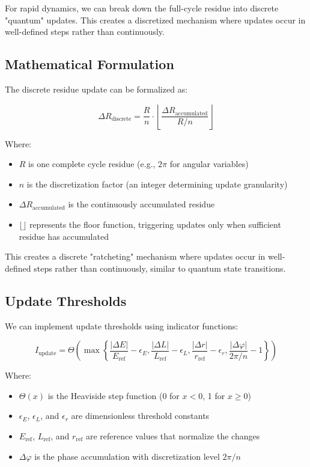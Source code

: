 \documentclass{article}
\begin{document}
For rapid dynamics, we can break down the full-cycle residue into discrete "quantum" updates. This creates a discretized mechanism where updates occur in well-defined steps rather than continuously.

\subsection{Mathematical Formulation}

The discrete residue update can be formalized as:

\begin{equation}
\Delta R_{\text{discrete}} = \frac{R}{n} \cdot \left\lfloor \frac{\Delta R_{\text{accumulated}}}{R/n} \right\rfloor
\end{equation}

Where:
\begin{itemize}
\item $R$ is one complete cycle residue (e.g., $2\pi$ for angular variables)
\item $n$ is the discretization factor (an integer determining update granularity)
\item $\Delta R_{\text{accumulated}}$ is the continuously accumulated residue
\item $\lfloor \rfloor$ represents the floor function, triggering updates only when sufficient residue has accumulated
\end{itemize}

This creates a discrete "ratcheting" mechanism where updates occur in well-defined steps rather than continuously, similar to quantum state transitions.

\subsection{Update Thresholds}

We can implement update thresholds using indicator functions:

\begin{equation}
I_{\text{update}} = \Theta\left(\max\left\{\frac{|\Delta E|}{E_{\text{ref}}} - \epsilon_E, \frac{|\Delta L|}{L_{\text{ref}}} - \epsilon_L, \frac{|\Delta r|}{r_{\text{ref}}} - \epsilon_r, \frac{|\Delta \varphi|}{2\pi/n} - 1\right\}\right)
\end{equation}

Where:
\begin{itemize}
\item $\Theta(x)$ is the Heaviside step function (0 for $x < 0$, 1 for $x \geq 0$)
\item $\epsilon_E$, $\epsilon_L$, and $\epsilon_r$ are dimensionless threshold constants
\item $E_{\text{ref}}$, $L_{\text{ref}}$, and $r_{\text{ref}}$ are reference values that normalize the changes
\item $\Delta \varphi$ is the phase accumulation with discretization level $2\pi/n$
\end{itemize}
\end{document}
